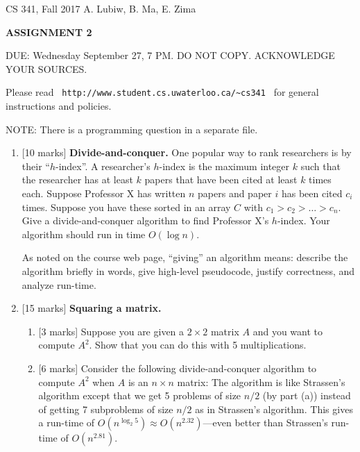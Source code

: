 \documentclass[11pt]{article}
\begin{document}
\noindent
{CS 341, Fall 2017 \hfill  A. Lubiw, B. Ma, E. Zima}


\begin{center}
{\large\bf ASSIGNMENT 2}
\end{center}

\bigskip
\noindent
DUE: Wednesday September 27, 7 PM.
DO NOT COPY.  ACKNOWLEDGE YOUR SOURCES.

\medskip
\noindent
Please read \verb| http://www.student.cs.uwaterloo.ca/~cs341 | for general
instructions and policies.

\medskip
\noindent
NOTE: There is a programming question in a separate file.


\medskip
\noindent

\begin{enumerate}

\item{[10 marks]}  {\bf Divide-and-conquer.}
One popular way to rank researchers is by their  ``$h$-index''.  
A researcher's $h$-index is the maximum integer $k$ such that the researcher has at least $k$ papers that have been cited at least $k$ times each.
Suppose Professor X has written $n$ papers and paper $i$ has been cited $c_i$ times.  
Suppose you have these sorted in an array $C$ with $c_1 > c_2 > \ldots > c_n$.  
Give a divide-and-conquer algorithm to find Professor X's $h$-index.  Your algorithm should run in time $O(\log n)$.  

As noted on the course web page, ``giving'' an algorithm means: describe the algorithm briefly in words, give high-level pseudocode, justify correctness, and analyze run-time.


\item{[15 marks]} {\bf Squaring a matrix.}
\begin{enumerate}
\item{} [3 marks] Suppose you are given a $2 \times 2$ matrix $A$ and you want to compute $A^2$.  Show that you can do this with 5 multiplications.


\item{} [6 marks]  Consider the following divide-and-conquer algorithm to compute $A^2$ when $A$ is an $n \times n$ matrix:  The algorithm is like Strassen's algorithm except that we get 5 problems of size $n/2$ (by part (a)) instead of getting 7 subproblems of size $n/2$ as in Strassen's algorithm.  This gives a run-time of $O(n^{\log_2 5}) \approx O(n^ {2.32})$---even better than Strassen's run-time of $O(n^{2.81})$.  


\end{enumerate}
\end{enumerate}
\end{document}
